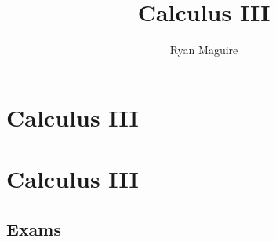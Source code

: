 \documentclass[crop=false,class=book,oneside]{standalone}
\begin{document}
    \ifx\ifmathcourses\undefined
        \title{Calculus III}
        \author{Ryan Maguire}
        \date{\vspace{-5ex}}
        \maketitle
        \tableofcontents
        \chapter*{Calculus III}
        \setcounter{chapter}{1}
    \else
        \chapter{Calculus III}
    \fi
    \section{Exams}
\end{document}
